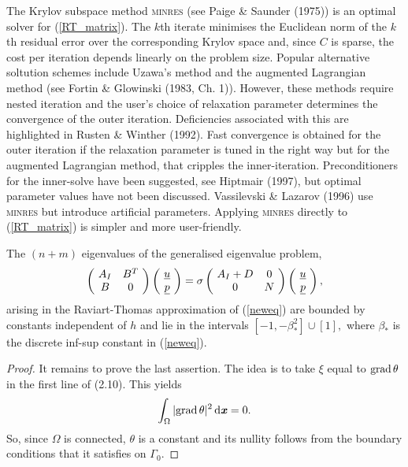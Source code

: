 \documentclass{imamci}
\numberwithin{equation}{section}
\begin{document}
The Krylov subspace method \textsc{minres} (see Paige \& Saunder (1975)) is an
optimal solver for (\ref{RT_matrix}). The $k$th iterate minimises the Euclidean
norm of the $k$th residual error over the corresponding Krylov space and,
since $C$ is sparse, the cost per iteration depends linearly on the problem
size. Popular alternative soltution schemes include Uzawa's method and the
augmented Lagrangian method (see Fortin \& Glowinski (1983, Ch. 1)). However, these
methods require nested iteration and the user's choice of relaxation parameter
determines the convergence of the outer iteration. Deficiencies associated
with this are highlighted in Rusten \& Winther (1992). Fast convergence is obtained
for the outer iteration if the relaxation parameter is tuned in the right
way but for the augmented Lagrangian method, that cripples the inner-iteration.
Preconditioners for the inner-solve have been suggested, see Hiptmair (1997),
but optimal parameter values have not been discussed. Vassilevski \& Lazarov
(1996)
use \textsc{minres} but  introduce artificial parameters. Applying \textsc{minres}
directly to (\ref{RT_matrix}) is simpler and more user-friendly.
\begin{lemma}\label{identitybd}
The $(n+m)$ eigenvalues of the generalised eigenvalue problem,
\begin{equation}
\left( \begin{array}{@{\ }cc@{\ }}
\mathnormal{A}_{I} & \mathnormal{B}^{T} \\
\mathnormal{B} & 0
\end{array} \right) \left( \begin{array}{@{\ }c@{\ }} 
 \underline{u} \\ 
 \underline{p}
\end{array} \right) = \sigma\left(\begin{array}{@{\ }cc@{\ }}
\mathnormal{A}_{I} + \mathnormal{D} & 0 \\
0 & \mathnormal{N} 
\end{array}\right) \left(\begin{array}{@{\ }c@{\ }} 
 \underline{u} \\
 \underline{p}
\end{array}\right),\label{RT_matrix}
\end{equation}
arising in the Raviart-Thomas approximation of (\ref{neweq}) are bounded by
constants independent of $h$ and lie in the intervals $\left[ -1, -\beta_{*}^{2}
\right] \cup \left[ 1 \right],$ where $\beta_{*}$ is the discrete inf-sup
constant in (\ref{neweq}).
\end{lemma}
\begin{proof}
It remains to prove the last assertion. The idea is to take ${\xi}$ equal to ${\rm grad}\,\theta$ in the first line of (2.10). This yields
$$
\int_\Omega \vert {\hbox{grad\,}}\theta\vert^2\,{\rm d} {\textbf{\textit{x}}} = 0.
$$
So, since $\Omega$ is connected, $\theta$ is a constant and its nullity follows
from the boundary conditions that it satisfies on $\Gamma_0$.
\end{proof}
\end{document}
